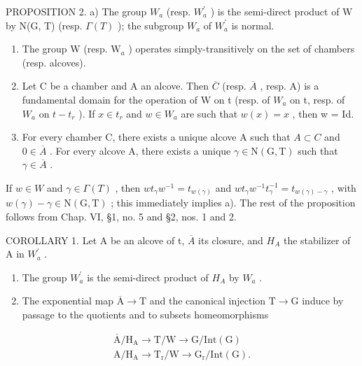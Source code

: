 PROPOSITION 2. a) The group \(W_{a}\) (resp. \(W_{a}^{\prime}\) ) is the semi-direct product of W by N(G, T) (resp. \(\Gamma(T)\) ); the subgroup \(W_{a}\) of \(W_{a}^{\prime}\) is normal.

\begin{enumerate}
\def\labelenumi{\alph{enumi})}
\setcounter{enumi}{1}
\item
  The group W (resp. \(\mathrm{W}_a\) ) operates simply-transitively on the set of chambers (resp. alcoves).
\item
  Let C be a chamber and A an alcove. Then \(\overline{C}\) (resp. \(\overline{A}\) , resp. A) is a fundamental domain for the operation of W on t (resp. of \(W_{a}\) on t, resp. of \(W_{a}\) on \(t-t_{r}\) ). If \(x \in t_{r}\) and \(w \in W_{a}\) are such that \(w(x) = x\) , then w = Id.
\item
  For every chamber C, there exists a unique alcove A such that \(A \subset C\) and \(0 \in \overline{A}\) . For every alcove A, there exists a unique \(\gamma \in \mathrm{N}(\mathrm{G}, \mathrm{T})\) such that \(\gamma \in \overline{A}\) .
\end{enumerate}

If \(w \in W\) and \(\gamma \in \Gamma(T)\) , then \(wt_{\gamma}w^{-1} = t_{w(\gamma)}\) and \(wt_{\gamma}w^{-1}t_{\gamma}^{-1} = t_{w(\gamma)-\gamma}\) , with \(w(\gamma) - \gamma \in \mathrm{N}(\mathrm{G}, \mathrm{T})\) ; this immediately implies a). The rest of the proposition follows from Chap. VI, §1, no. 5 and §2, nos. 1 and 2.

COROLLARY 1. Let A be an alcove of t, \(\overline{A}\) its closure, and \(H_{A}\) the stabilizer of A in \(W_{a}^{\prime}\) .

\begin{enumerate}
\def\labelenumi{\alph{enumi})}
\item
  The group \(W_{a}^{\prime}\) is the semi-direct product of \(H_{A}\) by \(W_{a}\) .
\item
  The exponential map \(\overline{\mathrm{A}}\to \mathrm{T}\) and the canonical injection \(\mathrm{T}\rightarrow \mathrm{G}\) induce by passage to the quotients and to subsets homeomorphisms
\end{enumerate}

\[
\begin{array}{l} \overline {{\mathrm{A}}} / \mathrm {H_ {A}} \to \mathrm{T} / \mathrm{W} \to \mathrm{G} / \mathrm{Int} (\mathrm{G}) \\ \mathrm{A} / \mathrm {H_ {A}} \to \mathrm {T_ {r}} / \mathrm{W} \to \mathrm {G_ {r}} / \mathrm{Int} (\mathrm{G}). \end{array}
\]

